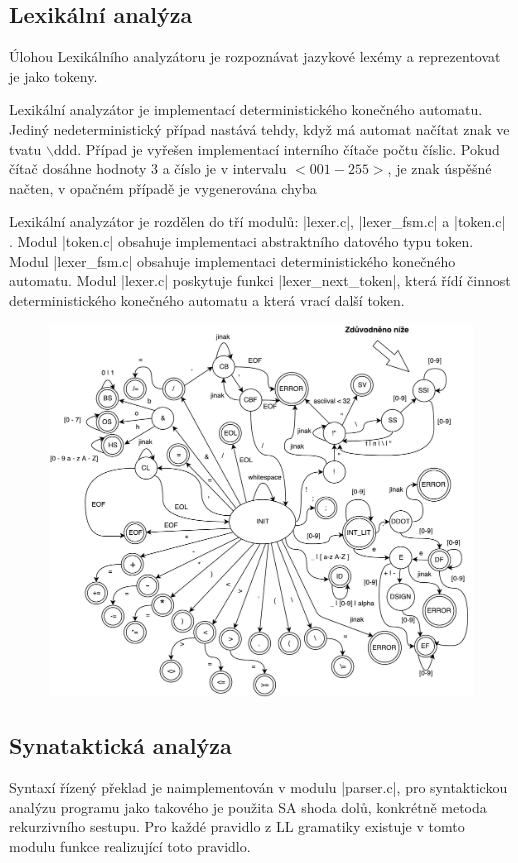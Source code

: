 \subsection{Lexikální analýza}
\label{subsec:lexer}
Úlohou Lexikálního analyzátoru je rozpoznávat jazykové lexémy a reprezentovat
je jako tokeny.

Lexikální analyzátor je implementací deterministického konečného
automatu. Jediný nedeterministický případ nastává tehdy, když má automat načítat znak ve tvatu $\backslash$ddd.
Případ je vyřešen implementací interního čítače počtu číslic. Pokud čítač dosáhne hodnoty 3 a číslo je
v intervalu $<001-255>$, je znak úspěšné načten, v opačném případě je vygenerována chyba

Lexikální analyzátor je rozdělen do tří modulů: \ic|lexer.c|, \ic|lexer_fsm.c| a \ic|token.c|
. Modul \ic|token.c| obsahuje implementaci abstraktního datového typu token. Modul \ic|lexer_fsm.c|
obsahuje implementaci deterministického konečného automatu. Modul \ic|lexer.c| poskytuje funkci
\ic|lexer_next_token|, která řídí činnost deterministického konečného automatu a
která vrací další token.

\vspace*{16px}
\begin{figure}[htbp]
    \centering
    \includegraphics[width=1\textwidth, angle=0]{src/assets/automat.pdf}
\end{figure}

\subsection{Synataktická analýza}
Syntaxí řízený překlad je naimplementován v modulu \ic|parser.c|, pro syntaktickou analýzu programu jako takového je
použita SA shoda dolů, konkrétně metoda rekurzivního sestupu. Pro každé pravidlo z LL gramatiky existuje v tomto
modulu funkce realizující toto pravidlo.

